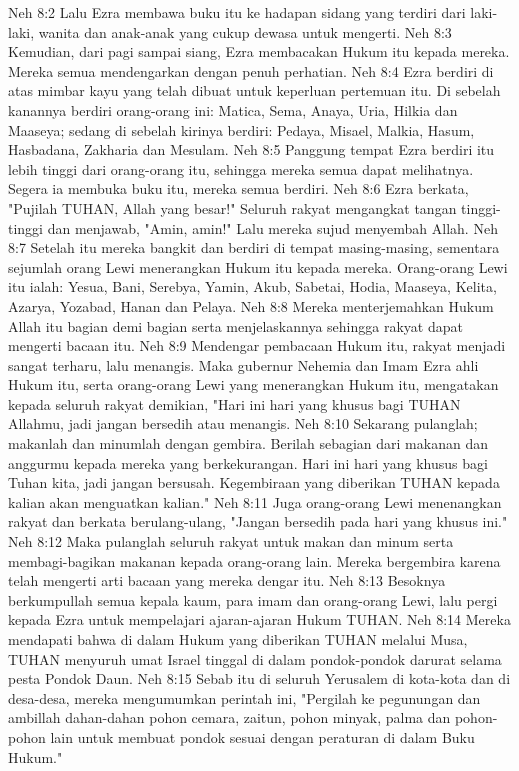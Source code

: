 Neh 8:2  Lalu Ezra membawa buku itu ke hadapan sidang yang terdiri dari laki-laki, wanita dan anak-anak yang cukup dewasa untuk mengerti.
Neh 8:3  Kemudian, dari pagi sampai siang, Ezra membacakan Hukum itu kepada mereka. Mereka semua mendengarkan dengan penuh perhatian.
Neh 8:4  Ezra berdiri di atas mimbar kayu yang telah dibuat untuk keperluan pertemuan itu. Di sebelah kanannya berdiri orang-orang ini: Matica, Sema, Anaya, Uria, Hilkia dan Maaseya; sedang di sebelah kirinya berdiri: Pedaya, Misael, Malkia, Hasum, Hasbadana, Zakharia dan Mesulam.
Neh 8:5  Panggung tempat Ezra berdiri itu lebih tinggi dari orang-orang itu, sehingga mereka semua dapat melihatnya. Segera ia membuka buku itu, mereka semua berdiri.
Neh 8:6  Ezra berkata, "Pujilah TUHAN, Allah yang besar!" Seluruh rakyat mengangkat tangan tinggi-tinggi dan menjawab, "Amin, amin!" Lalu mereka sujud menyembah Allah.
Neh 8:7  Setelah itu mereka bangkit dan berdiri di tempat masing-masing, sementara sejumlah orang Lewi menerangkan Hukum itu kepada mereka. Orang-orang Lewi itu ialah: Yesua, Bani, Serebya, Yamin, Akub, Sabetai, Hodia, Maaseya, Kelita, Azarya, Yozabad, Hanan dan Pelaya.
Neh 8:8  Mereka menterjemahkan Hukum Allah itu bagian demi bagian serta menjelaskannya sehingga rakyat dapat mengerti bacaan itu.
Neh 8:9  Mendengar pembacaan Hukum itu, rakyat menjadi sangat terharu, lalu menangis. Maka gubernur Nehemia dan Imam Ezra ahli Hukum itu, serta orang-orang Lewi yang menerangkan Hukum itu, mengatakan kepada seluruh rakyat demikian, "Hari ini hari yang khusus bagi TUHAN Allahmu, jadi jangan bersedih atau menangis.
Neh 8:10  Sekarang pulanglah; makanlah dan minumlah dengan gembira. Berilah sebagian dari makanan dan anggurmu kepada mereka yang berkekurangan. Hari ini hari yang khusus bagi Tuhan kita, jadi jangan bersusah. Kegembiraan yang diberikan TUHAN kepada kalian akan menguatkan kalian."
Neh 8:11  Juga orang-orang Lewi menenangkan rakyat dan berkata berulang-ulang, "Jangan bersedih pada hari yang khusus ini."
Neh 8:12  Maka pulanglah seluruh rakyat untuk makan dan minum serta membagi-bagikan makanan kepada orang-orang lain. Mereka bergembira karena telah mengerti arti bacaan yang mereka dengar itu.
Neh 8:13  Besoknya berkumpullah semua kepala kaum, para imam dan orang-orang Lewi, lalu pergi kepada Ezra untuk mempelajari ajaran-ajaran Hukum TUHAN.
Neh 8:14  Mereka mendapati bahwa di dalam Hukum yang diberikan TUHAN melalui Musa, TUHAN menyuruh umat Israel tinggal di dalam pondok-pondok darurat selama pesta Pondok Daun.
Neh 8:15  Sebab itu di seluruh Yerusalem di kota-kota dan di desa-desa, mereka mengumumkan perintah ini, "Pergilah ke pegunungan dan ambillah dahan-dahan pohon cemara, zaitun, pohon minyak, palma dan pohon-pohon lain untuk membuat pondok sesuai dengan peraturan di dalam Buku Hukum."
